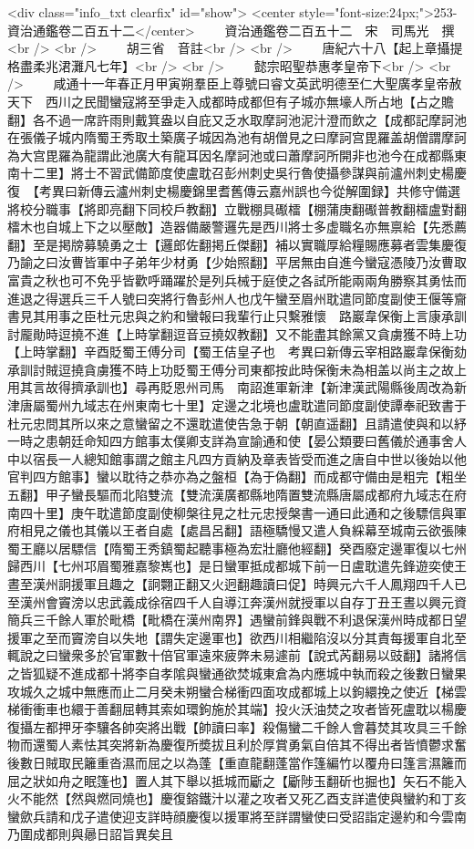<div class="info_txt clearfix" id="show">
<center style="font-size:24px;">253-資治通鑑卷二百五十二</center>
  　　資治通鑑卷二百五十二　宋　司馬光　撰<br />
<br />
　　胡三省　音註<br />
<br />
　　唐紀六十八【起上章攝提格盡柔兆涒灘凡七年】<br />
<br />
　　懿宗昭聖恭惠孝皇帝下<br />
<br />
　　咸通十一年春正月甲寅朔羣臣上尊號曰睿文英武明德至仁大聖廣孝皇帝赦天下　西川之民聞蠻寇將至爭走入成都時成都但有子城亦無壕人所占地【占之贍翻】各不過一席許雨則戴箕盎以自庇又乏水取摩訶池泥汁澄而飲之【成都記摩訶池在張儀子城内隋蜀王秀取土築廣子城因為池有胡僧見之曰摩訶宫毘羅盖胡僧謂摩訶為大宫毘羅為龍謂此池廣大有龍耳因名摩訶池或曰蕭摩訶所開非也池今在成都縣東南十二里】將士不習武備節度使盧耽召彭州刺史吳行魯使攝參謀與前瀘州刺史楊慶復　【考異曰新傳云瀘州刺史楊慶錦里耆舊傳云嘉州誤也今從解圍録】共修守備選將校分職事【將即亮翻下同校戶教翻】立戰棚具礟檑【棚蒲庚翻礟普教翻檑盧對翻檑木也自城上下之以壓敵】造器備嚴警邏先是西川將士多虚職名亦無禀給【先悉薦翻】至是掲牓募驍勇之士【邏郎佐翻掲丘傑翻】補以實職厚給糧賜應募者雲集慶復乃諭之曰汝曹皆軍中子弟年少材勇【少始照翻】平居無由自進今蠻寇憑陵乃汝曹取富貴之秋也可不免乎皆歡呼踊躍於是列兵械于庭使之各試所能兩兩角勝察其勇怯而進退之得選兵三千人號曰突將行魯彭州人也戊午蠻至眉州耽遣同節度副使王偃等齎書見其用事之臣杜元忠與之約和蠻報曰我輩行止只繫雅懷　路巖韋保衡上言康承訓討龎勛時逗撓不進【上時掌翻逗音豆撓奴教翻】又不能盡其餘黨又貪虜獲不時上功【上時掌翻】辛酉貶蜀王傅分司【蜀王佶皇子也　考異曰新傳云宰相路巖韋保衡劾承訓討賊逗撓貪虜獲不時上功貶蜀王傅分司東都按此時保衡未為相盖以尚主之故上用其言故得擠承訓也】尋再貶恩州司馬　南詔進軍新津【新津漢武陽縣後周改為新津唐屬蜀州九域志在州東南七十里】定邊之北境也盧耽遣同節度副使譚奉祀致書于杜元忠問其所以來之意蠻留之不還耽遣使告急于朝【朝直遥翻】且請遣使與和以紓一時之患朝廷命知四方館事太僕卿支詳為宣諭通和使【晏公類要曰舊儀於通事舍人中以宿長一人總知館事謂之館主凡四方貢納及章表皆受而進之唐自中世以後始以他官判四方館事】蠻以耽待之恭亦為之盤桓【為于偽翻】而成都守備由是粗完【粗坐五翻】甲子蠻長驅而北陷雙流【雙流漢廣都縣地隋置雙流縣唐屬成都府九域志在府南四十里】庚午耽遣節度副使柳槃往見之杜元忠授槃書一通曰此通和之後驃信與軍府相見之儀也其儀以王者自處【處昌呂翻】語極驕慢又遣人負綵幕至城南云欲張陳蜀王廳以居驃信【隋蜀王秀鎮蜀起聽事極為宏壯廳他經翻】癸酉廢定邊軍復以七州歸西川【七州邛眉蜀雅嘉黎嶲也】是日蠻軍抵成都城下前一日盧耽遣先鋒遊奕使王晝至漢州詗援軍且趣之【詗翾正翻又火迥翻趣讀曰促】時興元六千人鳳翔四千人已至漢州會竇滂以忠武義成徐宿四千人自導江奔漢州就授軍以自存丁丑王晝以興元資簡兵三千餘人軍於毗橋【毗橋在漢州南界】遇蠻前鋒與戰不利退保漢州時成都日望援軍之至而竇滂自以失地【謂失定邊軍也】欲西川相繼陷沒以分其責每援軍自北至輒說之曰蠻衆多於官軍數十倍官軍遠來疲弊未易遽前【說式芮翻易以豉翻】諸將信之皆狐疑不進成都十將李自孝隂與蠻通欲焚城東倉為内應城中執而殺之後數日蠻果攻城久之城中無應而止二月癸未朔蠻合梯衝四面攻成都城上以鉤繯挽之使近【梯雲梯衝衝車也繯于善翻屈轉其索如環鉤施於其端】投火沃油焚之攻者皆死盧耽以楊慶復攝左都押牙李驤各帥突將出戰【帥讀曰率】殺傷蠻二千餘人會暮焚其攻具三千餘物而還蜀人素怯其突將新為慶復所奬拔且利於厚賞勇氣自倍其不得出者皆憤鬱求奮後數日賊取民籬重沓濕而屈之以為蓬【重直龍翻蓬當作篷編竹以覆舟曰篷言濕籬而屈之狀如舟之眠篷也】置人其下舉以抵城而斸之【斸陟玉翻斫也掘也】矢石不能入火不能然【然與燃同燒也】慶復鎔鐵汁以灌之攻者又死乙酉支詳遣使與蠻約和丁亥蠻歛兵請和戊子遣使迎支詳時顔慶復以援軍將至詳謂蠻使曰受詔詣定邊約和今雲南乃圍成都則與曏日詔旨異矣且